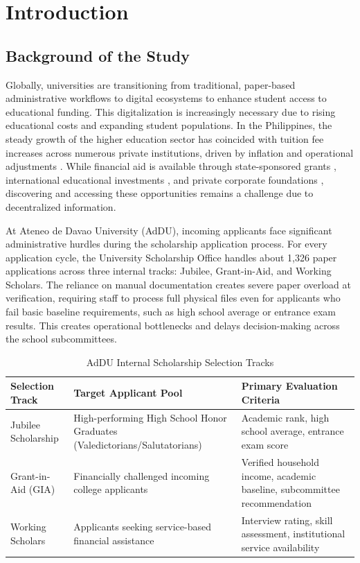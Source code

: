\chapter{Introduction}
\label{ch:introduction}

\section{Background of the Study}

Globally, universities are transitioning from traditional, paper-based administrative workflows to digital ecosystems to enhance student access to educational funding. This digitalization is increasingly necessary due to rising educational costs and expanding student populations. In the Philippines, the steady growth of the higher education sector \cite{ref29} has coincided with tuition fee increases across numerous private institutions, driven by inflation and operational adjustments \cite{ref11,ref19}. While financial aid is available through state-sponsored grants \cite{ref21,ref44}, international educational investments \cite{ref45}, and private corporate foundations \cite{ref1,ref40}, discovering and accessing these opportunities remains a challenge due to decentralized information.

At Ateneo de Davao University (AdDU), incoming applicants face significant administrative hurdles during the scholarship application process. For every application cycle, the University Scholarship Office handles about 1,326 paper applications across three internal tracks: Jubilee, Grant-in-Aid, and Working Scholars. The reliance on manual documentation creates severe paper overload at verification, requiring staff to process full physical files even for applicants who fail basic baseline requirements, such as high school average or entrance exam results. This creates operational bottlenecks and delays decision-making across the school subcommittees.

\begin{table}[htbp]
  \centering
  \caption{AdDU Internal Scholarship Selection Tracks}
  \label{tab:selection-tracks}
  \begin{tabular}{@{}p{3.4cm} p{5.1cm} p{5.2cm}@{}}
    \toprule
    Selection Track & Target Applicant Pool & Primary Evaluation Criteria \\
    \midrule
    Jubilee Scholarship & High-performing High School Honor Graduates (Valedictorians/Salutatorians) & Academic rank, high school average, entrance exam score \\
    \addlinespace
    Grant-in-Aid (GIA) & Financially challenged incoming college applicants & Verified household income, academic baseline, subcommittee recommendation \\
    \addlinespace
    Working Scholars & Applicants seeking service-based financial assistance & Interview rating, skill assessment, institutional service availability \\
    \bottomrule
  \end{tabular}
\end{table}

